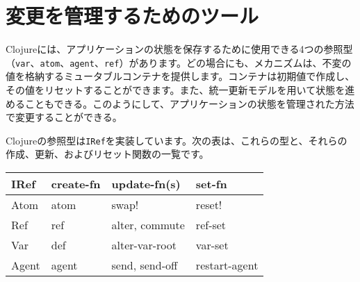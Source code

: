 \section{変更を管理するためのツール}

Clojureには、アプリケーションの状態を保存するために使用できる4つの参照型（\texttt{var}、\texttt{atom}、\texttt{agent}、\texttt{ref}）があります。どの場合にも、メカニズムは、不変の値を格納するミュータブルコンテナを提供します。コンテナは初期値で作成し、その値をリセットすることができます。また、統一更新モデルを用いて状態を進めることもできる。このようにして、アプリケーションの状態を管理された方法で変更することができる。

Clojureの参照型は\texttt{IRef}を実装しています。次の表は、これらの型と、それらの作成、更新、およびリセット関数の一覧です。

\begin{tabular}{|l|l|l|l|}
\hline
IRef & create-fn & update-fn(s) & set-fn \\ \hline \hline
Atom & atom & swap! & reset! \\ \hline
Ref & ref & alter, commute & ref-set \\ \hline
Var & def & alter-var-root & var-set \\ \hline
Agent & agent & send, send-off & restart-agent \\ \hline
\end{tabular}





